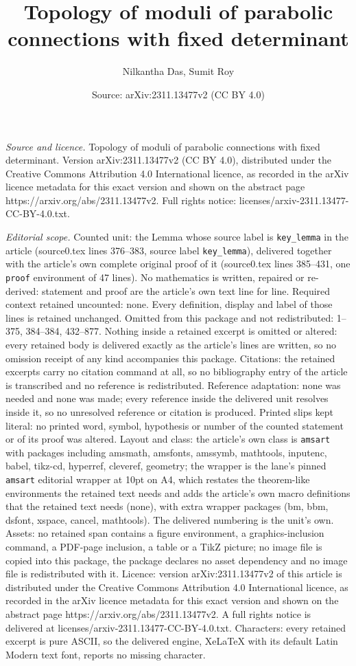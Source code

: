 \documentclass[10pt,a4paper]{amsart}
\title[Topology of moduli of parabolic connections with fixed deter]{Topology of moduli of parabolic connections with fixed determinant}
\author{Nilkantha Das, Sumit Roy}
\date{Source: arXiv:2311.13477v2 (CC BY 4.0)}
\begin{document}
\maketitle

\noindent\emph{Source and licence.} Topology of moduli of parabolic connections with fixed determinant. Version arXiv:2311.13477v2 (CC BY 4.0), distributed under the Creative Commons Attribution 4.0 International licence, as recorded in the arXiv licence metadata for this exact version and shown on the abstract page https://arxiv.org/abs/2311.13477v2. Full rights notice: licenses/arxiv-2311.13477-CC-BY-4.0.txt.\par\smallskip

\noindent\textit{Editorial scope.} Counted unit: the Lemma whose source label is \texttt{key\_lemma} in the article (source0.tex lines 376--383, source label \texttt{key\_lemma}), delivered together with the article's own complete original proof of it (source0.tex lines 385--431, one \texttt{proof} environment of 47 lines). No mathematics is written, repaired or re-derived: statement and proof are the article's own text line for line. Required context retained uncounted: none. Every definition, display and label of those lines is retained unchanged. Omitted from this package and not redistributed: 1--375, 384--384, 432--877. Nothing inside a retained excerpt is omitted or altered: every retained body is delivered exactly as the article's lines are written, so no omission receipt of any kind accompanies this package. Citations: the retained excerpts carry no citation command at all, so no bibliography entry of the article is transcribed and no reference is redistributed. Reference adaptation: none was needed and none was made; every reference inside the delivered unit resolves inside it, so no unresolved reference or citation is produced. Printed slips kept literal: no printed word, symbol, hypothesis or number of the counted statement or of its proof was altered. Layout and class: the article's own class is \texttt{amsart} with packages including amsmath, amsfonts, amssymb, mathtools, inputenc, babel, tikz-cd, hyperref, cleveref, geometry; the wrapper is the lane's pinned \texttt{amsart} editorial wrapper at 10pt on A4, which restates the theorem-like environments the retained text needs and adds the article's own macro definitions that the retained text needs (none), with extra wrapper packages (bm, bbm, dsfont, xspace, cancel, mathtools). The delivered numbering is the unit's own. Assets: no retained span contains a figure environment, a graphics-inclusion command, a PDF-page inclusion, a table or a TikZ picture; no image file is copied into this package, the package declares no asset dependency and no image file is redistributed with it. Licence: version arXiv:2311.13477v2 of this article is distributed under the Creative Commons Attribution 4.0 International licence, as recorded in the arXiv licence metadata for this exact version and shown on the abstract page https://arxiv.org/abs/2311.13477v2. A full rights notice is delivered at licenses/arxiv-2311.13477-CC-BY-4.0.txt. Characters: every retained excerpt is pure ASCII, so the delivered engine, XeLaTeX with its default Latin Modern text font, reports no missing character.
\end{document}
